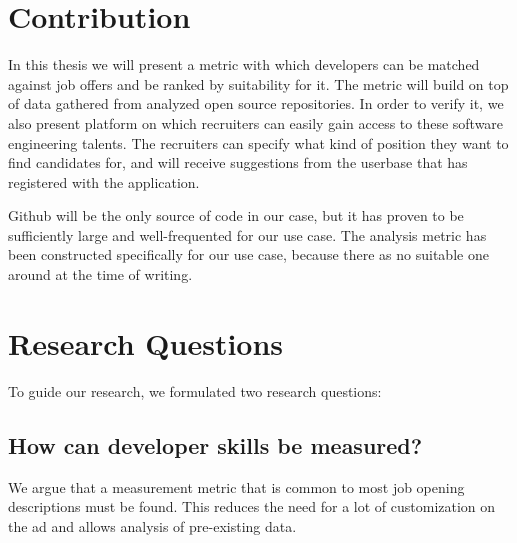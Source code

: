 \section{Contribution}
In this thesis we will present a metric with which developers can be matched
against job offers and be ranked by suitability for it.
The metric will build on top of data gathered from analyzed open source repositories.
In order to verify it, we also present platform on which recruiters can easily
gain access to these software engineering talents. The recruiters can specify
what kind of position they want to find candidates for, and will receive
suggestions from the userbase that has registered with the application.

Github will be the only source of code in our case, but it has proven
to be sufficiently large and well-frequented for our use case.
The analysis metric has been constructed specifically for our use case,
because there as no suitable one around at the time of writing.

\section{Research Questions} \label{sec:research-questions}
To guide our research, we formulated two research questions:

\subsection{How can developer skills be measured?}\label{subsec:dev-skill-measurement}
We argue that a measurement metric that is common to most job opening
descriptions must be found. This reduces the need for a lot of customization
on the ad and allows analysis of pre-existing data.
\newline

